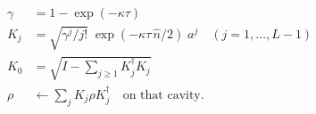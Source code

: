 \documentclass[12pt]{article}
\begin{document}
\fontsize{22}{28}\selectfont
\begin{align*}
\gamma &= 1 - \exp(-\kappa\tau) \\[0.45em]
K_j &= \sqrt{\gamma^j / j!}\; \exp(-\kappa\tau\,\hat{n}/2)\; a^j
      \quad (j=1,\ldots,L-1) \\[0.45em]
K_0 &= \sqrt{I - \sum_{j\ge 1} K_j^\dagger K_j} \\[0.45em]
\rho &\leftarrow \sum_j K_j \rho K_j^\dagger
      \quad \text{on that cavity.}
\end{align*}
\end{document}
